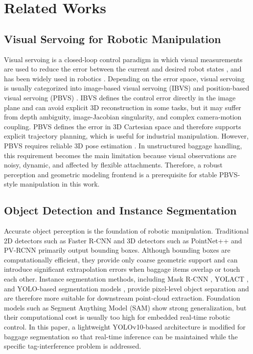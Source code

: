 \section{Related Works}
\subsection{Visual Servoing for Robotic Manipulation}
Visual servoing is a closed-loop control paradigm in which visual measurements are used to reduce the error between the current and desired robot states \cite{chaumette2008visual}, and has been widely used in robotics \cite{wang2023visual, he2023image}. Depending on the error space, visual servoing is usually categorized into image-based visual servoing (IBVS) and position-based visual servoing (PBVS) . IBVS defines the control error directly in the image plane and can avoid explicit 3D reconstruction in some tasks, but it may suffer from depth ambiguity, image-Jacobian singularity, and complex camera-motion coupling. PBVS \cite{lippiello2007position} defines the error in 3D Cartesian space and therefore supports explicit trajectory planning, which is useful for industrial manipulation. However, PBVS requires reliable 3D pose estimation \cite{zhu2024position, chaumette2008visual}. In unstructured baggage handling, this requirement becomes the main limitation because visual observations are noisy, dynamic, and affected by flexible attachments. Therefore, a robust perception and geometric modeling frontend is a prerequisite for stable PBVS-style manipulation in this work.

\subsection{Object Detection and Instance Segmentation}
Accurate object perception is the foundation of robotic manipulation. Traditional 2D detectors such as Faster R-CNN \cite{ren2015faster} and 3D detectors such as PointNet++ \cite{qi2017pointnet++} and PV-RCNN \cite{shi2020pv} primarily output bounding boxes. Although bounding boxes are computationally efficient, they provide only coarse geometric support and can introduce significant extrapolation errors when baggage items overlap or touch each other. Instance segmentation methods, including Mask R-CNN \cite{he2017mask}, YOLACT \cite{bolya2019yolact}, and YOLO-based segmentation models \cite{Jocher_Ultralytics_YOLO26_Unified_2026}, provide pixel-level object separation and are therefore more suitable for downstream point-cloud extraction. Foundation models such as Segment Anything Model (SAM) \cite{kirillov2023segment} show strong generalization, but their computational cost is usually too high for embedded real-time robotic control. In this paper, a lightweight YOLOv10-based architecture is modified for baggage segmentation so that real-time inference can be maintained while the specific tag-interference problem is addressed.

